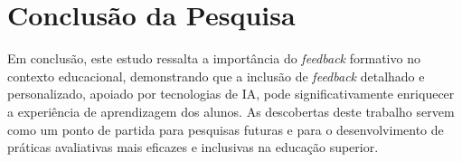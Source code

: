 \section{Conclusão da Pesquisa}

Em conclusão, este estudo ressalta a importância do \textit{feedback} formativo no contexto educacional, demonstrando que a inclusão de \textit{feedback} detalhado e personalizado, apoiado por tecnologias de IA, pode significativamente enriquecer a experiência de aprendizagem dos alunos. As descobertas deste trabalho servem como um ponto de partida para pesquisas futuras e para o desenvolvimento de práticas avaliativas mais eficazes e inclusivas na educação superior.